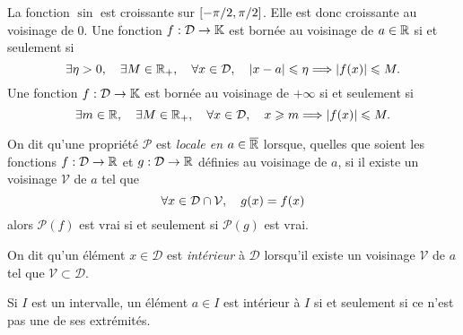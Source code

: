 \documentclass{magnolia}
\begin{document}


\begin{remarques}
\remarque La fonction $\sin$ est croissante sur $\left[-\pi/2,\pi/2\right]$. Elle
  est donc croissante au voisinage de 0.
\remarque Une fonction $f:\mathcal{D}\to\mathbb{K}$ est bornée au voisinage de $a\in\mathbb{R}$ si et seulement si
   \[\exists \eta>0 ,\quad \exists M\in\mathbb{R}_+ ,\quad \forall x\in\mathcal{D}
     ,\quad \left|x-a\right|\leqslant\eta \Longrightarrow \left|f(x)\right|\leqslant M.\]
  Une fonction $f:\mathcal{D}\to\mathbb{K}$ est bornée au voisinage de $+\infty$ si et seulement si
   \[\exists m\in\mathbb{R} ,\quad \exists M\in\mathbb{R}_+ ,\quad \forall x\in\mathcal{D}
     ,\quad x\geqslant m \Longrightarrow \left|f(x)\right|\leqslant M.\]
\end{remarques}


\begin{definition}[utile=-3]
On dit qu'une propriété $\mathcal{P}$ est \emph{locale en $a\in\overline{\mathbb{R}}$} lorsque, quelles que
soient les fonctions $f:\mathcal{D}\to\mathbb{R}$ et $g:\mathcal{D}\to\mathbb{R}$ définies au voisinage de $a$, si il
existe un voisinage $\mathcal{V}$ de $a$ tel que
\[\forall x\in\mathcal{D}\cap\mathcal{V} ,\quad g(x)=f(x)\]
alors $\mathcal{P}(f)$ est vrai si et seulement si $\mathcal{P}(g)$ est vrai.
\end{definition}


\begin{definition}
On dit qu'un élément $x\in \mathcal{D}$ est \emph{intérieur} à $\mathcal{D}$ lorsqu'il existe un voisinage
$\mathcal{V}$ de $a$ tel que $\mathcal{V}\subset\mathcal{D}$. 
\end{definition}

\begin{remarqueUnique}
\remarque Si $I$ est un intervalle, un élément $a\in I$ est intérieur à $I$ si et seulement si ce n'est pas
  une de ses extrémités.
\end{remarqueUnique}
\end{document}
